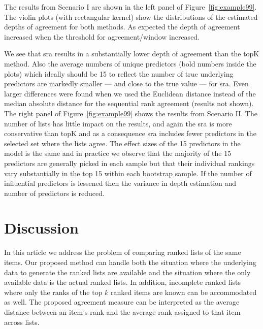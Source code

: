 \documentclass[oupdraft]{bio}
\newcommand{\added}[1]{{\color{added}{}#1}}
\begin{document}
The results from Scenario I are shown in the left panel of
Figure~\ref{fig:example99}. The violin plots (with rectangular kernel)
show the distributions of the estimated depths of agreement for both
methods. As expected the depth of agreement increased when the
threshold for agreement/window increased.

\added{
We see that sra results in a substantially lower depth of agreement
than the topK method. Also the average numbers of unique predictors
(bold numbers inside the plots) \added{which ideally should be 15 to
  reflect the number of true underlying predictors} are markedly
smaller --- and close to the true value --- for sra. Even larger
differences were found when we used the Euclidean distance instead of
the median absolute distance for the sequential rank agreement
(results not shown).  The right panel of Figure~\ref{fig:example99}
shows the results from Scenario II. The number of lists has little
impact on the results, and again the sra is more conservative than
topK and as a consequence sra includes fewer predictors in the
selected set where the lists agree. The effect sizes of the 15 predictors in the model is the
same and in practice we observe that the majority of the 15 predictors
are generally picked in each sample but that their individual rankings
vary substantially in the top 15 within each bootstrap sample. If the
number of influential predictors is lessened then the variance in
depth estimation and number of predictors is reduced.}
 
\section{Discussion}
In this article we address the problem of comparing ranked lists of
the same items. Our proposed method can handle both the situation
where the underlying data to generate the ranked lists are available
and the situation where the only available data is the actual ranked
lists. In addition, incomplete ranked lists where only the ranks of the
top $k$ ranked items are known can be accommodated as well. The
proposed agreement measure can be interpreted as the average distance
between an item's rank and the average rank assigned to that item
across lists.
\end{document}
